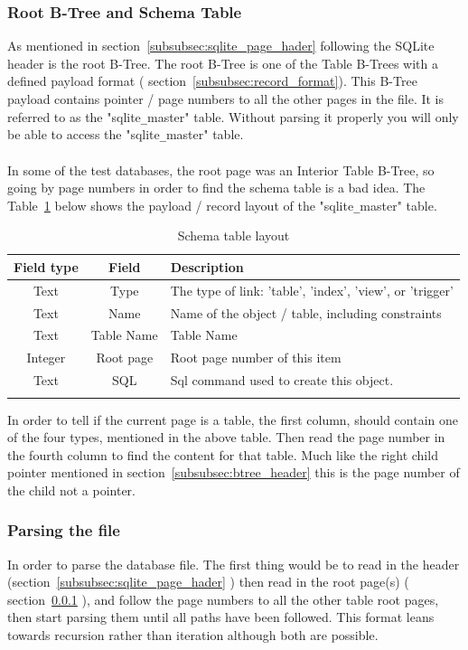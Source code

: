 \subsubsection{Root B-Tree and Schema Table}
\label{subsubsec:schema_table}

As mentioned in section~\ref{subsubsec:sqlite_page_hader} following the SQLite header is the root B-Tree. The root B-Tree is one of the Table B-Trees with a defined payload format ( section~\ref{subsubsec:record_format}). This B-Tree payload contains pointer / page numbers to all the other pages in the file. It is referred to as the "sqlite\verb|_|master" table. Without parsing it properly you will only be able to access the "sqlite\verb|_|master" table.
\\\\
In some of the test databases, the root page was an Interior Table B-Tree, so going by page numbers in order to find the schema table is a bad idea. The Table~\ref{tbl:schema_table} below shows the payload / record layout of the "sqlite\verb|_|master" table.

\begin{longtable}[h]{| c | c| p{10cm} |}
		\hline
			\textbf{Field type} & \textbf{Field} & \textbf{Description} \\ 
		\hline
		\endhead
			Text & Type & The type of link: 'table', 'index', 'view', or 'trigger' \\
		\hline
			Text & Name & Name of the object / table, including constraints \\
		\hline
			Text & Table Name & Table Name \\
		\hline
			Integer & Root page & Root page number of this item \\
		\hline
			Text & SQL & Sql command used to create this object. \\
		\hline
	\caption{Schema table layout}
	\label{tbl:schema_table}
\end{longtable}

In order to tell if the current page is a table, the first column, should contain one of the four types, mentioned in the above table. Then read the page number in the fourth column to find the content for that table. Much like the right child pointer mentioned in section~\ref{subsubsec:btree_header} this is the page number of the child not a pointer.

\subsubsection{Parsing the file}
\label{subsubsec:parsing the file}

In order to parse the database file. The first thing would be to read in the header (section~\ref{subsubsec:sqlite_page_hader} ) then read in the root page(s) ( section~\ref{subsubsec:schema_table} ), and follow the page numbers to all the other table root pages, then start parsing them until all paths have been followed. This format leans towards recursion rather than iteration although both are possible.

